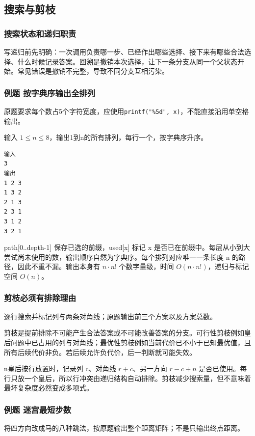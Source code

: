 \subsection{搜索与剪枝}
\subsubsection{搜索状态和递归职责}
写递归前先明确：一次调用负责哪一步、已经作出哪些选择、接下来有哪些合法选择、什么时候记录答案。回溯是撤销本次选择，让下一条分支从同一个父状态开始。常见错误是撤销不完整，导致不同分支互相污染。

\subsubsection{例题 按字典序输出全排列}
原题要求每个数占5个字符宽度，应使用\texttt{printf("\%5d", x)}，不能直接沿用单空格输出。

输入 $1\le n\le8$，输出1到n的所有排列，每行一个，按字典序升序。
\begin{verbatim}
输入
3
输出
1 2 3
1 3 2
2 1 3
2 3 1
3 1 2
3 2 1
\end{verbatim}
path[0..depth-1] 保存已选的前缀，used[x] 标记 x 是否已在前缀中。每层从小到大尝试尚未使用的数，输出顺序自然为字典序。每个排列对应唯一一条长度 n 的路径，因此不重不漏。输出本身有 $n\cdot n!$ 个数字量级，时间 $O(n\cdot n!)$，递归与标记空间 $O(n)$。

\subsubsection{剪枝必须有排除理由}
逐行搜索并标记列与两条对角线；原题输出前三个方案以及方案总数。

剪枝是提前排除不可能产生合法答案或不可能改善答案的分支。可行性剪枝例如皇后问题中已占用的列与对角线；最优性剪枝例如当前代价已不小于已知最优值，且所有后续代价非负。若后续允许负代价，后一判断就可能失效。

n皇后按行放置时，记录列 c、对角线 $r+c$、另一方向 $r-c+n$ 是否已使用。每行只放一个皇后，所以行冲突由递归结构自动排除。剪枝减少搜索量，但不意味着最坏复杂度必然变成多项式。

\subsubsection{例题 迷宫最短步数}
将四方向改成马的八种跳法，按原题输出整个距离矩阵；不是只输出终点距离。

